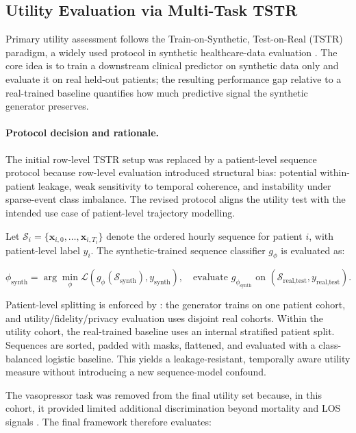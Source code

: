 \subsection{Utility Evaluation via Multi-Task TSTR}

Primary utility assessment follows the Train-on-Synthetic, Test-on-Real (TSTR) paradigm, a widely used protocol in synthetic healthcare-data evaluation \cite{esteban2018rcgan,yan2022benchmarking}. The core idea is to train a downstream clinical predictor on synthetic data only and evaluate it on real held-out patients; the resulting performance gap relative to a real-trained baseline quantifies how much predictive signal the synthetic generator preserves.

\paragraph{Protocol decision and rationale.}

The initial row-level TSTR setup was replaced by a patient-level sequence protocol because row-level evaluation introduced structural bias: potential within-patient leakage, weak sensitivity to temporal coherence, and instability under sparse-event class imbalance. The revised protocol aligns the utility test with the intended use case of patient-level trajectory modelling.

Let $\mathcal{S}_i = \{\mathbf{x}_{i,0}, \ldots, \mathbf{x}_{i,T_i}\}$ denote the ordered hourly sequence for patient $i$, with patient-level label $y_i$. The synthetic-trained sequence classifier $g_{\phi}$ is evaluated as:

\begin{equation}
\phi_{\text{synth}} = \arg\min_{\phi}\mathcal{L}(g_{\phi}(\mathcal{S}_{\text{synth}}), y_{\text{synth}}), \quad
\text{evaluate } g_{\phi_{\text{synth}}} \text{ on } (\mathcal{S}_{\text{real,test}}, y_{\text{real,test}}).
\end{equation}

Patient-level splitting is enforced by : the generator trains on one patient cohort, and utility/fidelity/privacy evaluation uses disjoint real cohorts. Within the utility cohort, the real-trained baseline uses an internal stratified patient split. Sequences are sorted, padded with masks, flattened, and evaluated with a class-balanced logistic baseline. This yields a leakage-resistant, temporally aware utility measure without introducing a new sequence-model confound.

The vasopressor task was removed from the final utility set because, in this cohort, it provided limited additional discrimination beyond mortality and LOS signals \cite{yan2022benchmarking}. The final framework therefore evaluates:

